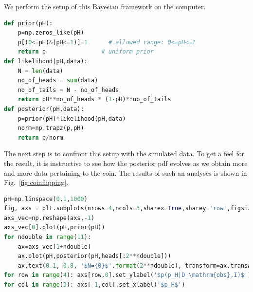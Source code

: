 \documentclass[%
oneside,                 %
final,                   %
10pt]{article}
\begin{document}
We perform the setup of this Bayesian framework on the computer.

\begin{lstlisting}[language=Python,style=blue1]
def prior(pH):
    p=np.zeros_like(pH)
    p[(0<=pH)&(pH<=1)]=1      # allowed range: 0<=pH<=1
    return p                # uniform prior
def likelihood(pH,data):
    N = len(data)
    no_of_heads = sum(data)
    no_of_tails = N - no_of_heads
    return pH**no_of_heads * (1-pH)**no_of_tails
def posterior(pH,data):
    p=prior(pH)*likelihood(pH,data)
    norm=np.trapz(p,pH)
    return p/norm
\end{lstlisting}

The next step is to confront this setup with the simulated data. To get a feel for the result, it is instructive to see how the posterior pdf evolves as we obtain more and more data pertaining to the coin. The results of such an analyses is shown in Fig.~\ref{fig:coinflipping}. 

\begin{lstlisting}[language=Python,style=blue1]
pH=np.linspace(0,1,1000)
fig, axs = plt.subplots(nrows=4,ncols=3,sharex=True,sharey='row',figsize=(14,14))
axs_vec=np.reshape(axs,-1)
axs_vec[0].plot(pH,prior(pH))
for ndouble in range(11):
    ax=axs_vec[1+ndouble]
    ax.plot(pH,posterior(pH,heads[:2**ndouble]))
    ax.text(0.1, 0.8, '$N={0}$'.format(2**ndouble), transform=ax.transAxes)
for row in range(4): axs[row,0].set_ylabel('$p(p_H|D_\mathrm{obs},I)$')
for col in range(3): axs[-1,col].set_xlabel('$p_H$')
\end{lstlisting}

\end{document}
